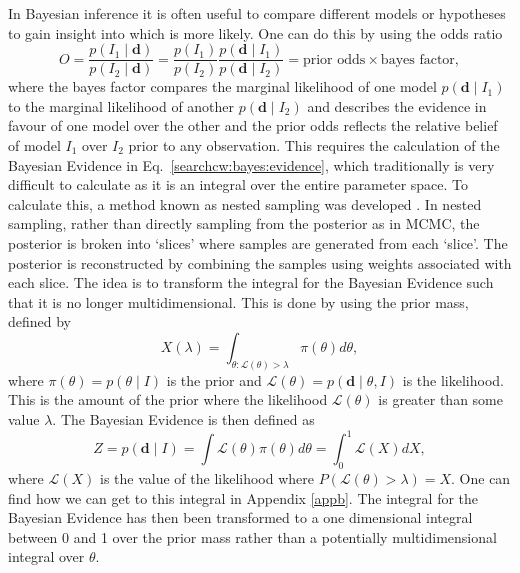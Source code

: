In Bayesian inference it is often useful to compare different models or hypotheses to gain insight into which is more likely. One can do this by using the odds ratio
%
\begin{equation}
O = \frac{ p(I_1 \mid {\bm d})}{p(I_2 \mid {\bm d})} = \frac{p(I_1)}{p(I_2)}\frac{p({\bm d} \mid I_1)}{p({\bm d} \mid I_2)} = \text{prior odds} \times \text{bayes factor},
\end{equation}
%
where the bayes factor compares the marginal likelihood of one model $p({\bm d} \mid I_1)$ to the marginal likelihood of another $p({\bm d} \mid I_2)$ and describes the evidence in favour of one model over the other and the prior odds reflects the relative belief of model $I_1$ over $I_2$ prior to any observation.
This requires the calculation of the Bayesian Evidence in Eq.~\ref{searchcw:bayes:evidence}, which traditionally is very difficult to calculate as it is an integral over the entire parameter space. To calculate this, a method known as nested sampling was developed
\citep{skilling2006NestedSampling,speagle2019DynestyDynamic}.
In nested sampling, rather than directly sampling from the posterior as in \gls{MCMC}, the posterior is broken into `slices' where samples are generated from each `slice'.
The posterior is reconstructed by combining the samples using weights associated with each slice.
The idea is to transform the integral for the Bayesian Evidence such that it is no longer multidimensional.
This is done by using the prior mass, defined by
\begin{equation}
\label{searchcw:bayes:nested:priormass}
X(\lambda) = \int_{\theta: \mathcal{L}(\theta) > \lambda} \pi(\theta) d\theta,
\end{equation}
where $\pi(\theta) = p(\theta \mid I)$ is the prior and $\mathcal{L}(\theta)=p(\bm{d} \mid \theta, I)$ is the likelihood. This is the amount of the prior where the likelihood $\mathcal{L}(\theta)$ is greater than some value $\lambda$.
The Bayesian Evidence is then defined as 
\begin{equation}
\label{searchcw:bayes:nested:evidence}
Z = p(\bm{d} \mid I) = \int \mathcal{L}(\theta) \pi(\theta) d\theta = \int_0^1 \mathcal{L}(X) dX,
\end{equation}
where $\mathcal{L}(X)$ is the value of the likelihood where $P(\mathcal{L}(\theta) > \lambda) = X$. One can find how we can get to this integral in Appendix \ref{appb}.
The integral for the Bayesian Evidence has then been transformed to a one dimensional integral between 0 and 1 over the prior mass rather than a potentially multidimensional integral over $\theta$.

